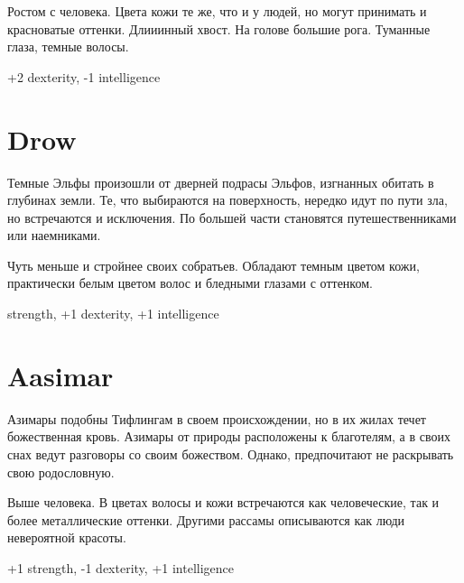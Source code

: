 \documentclass[a4paper,12pt,twocolumn]{book}
\begin{document}
Ростом с человека. Цвета кожи те же, что и у людей, но могут принимать и красноватые оттенки. Длииинный хвост. На голове большие рога. Туманные глаза, темные волосы.

\smallskip
+2 dexterity, -1 intelligence

%

\section{Drow}

Темные Эльфы произошли от дверней подрасы Эльфов, изгнанных обитать в глубинах земли. Те, что выбираются на поверхность, нередко идут по пути зла, но встречаются и исключения. По большей части становятся путешественниками или наемниками.

Чуть меньше и стройнее своих собратьев. Обладают темным цветом кожи, практически белым цветом волос и бледными глазами с оттенком.

 strength, +1 dexterity, +1 intelligence

\section{Aasimar}

Азимары подобны Тифлингам в своем происхождении, но в их жилах течет божественная кровь.  Азимары от природы расположены к благотелям, а в своих снах ведут разговоры со своим божеством. Однако, предпочитают не раскрывать свою родословную.

Выше человека. В цветах волосы и кожи встречаются как человеческие, так и более металлические оттенки. Другими рассамы описываются как люди невероятной красоты. 



\smallskip
+1 strength, -1 dexterity, +1 intelligence
\end{document}

